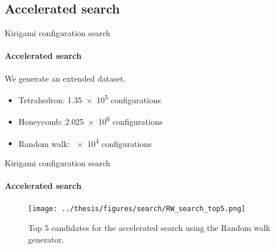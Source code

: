 \documentclass[
	10pt, %
]{beamer}
\begin{document}
\subsection{Accelerated search}
\begin{frame}{Kirigami configuration search}
	\framesubtitle{Accelerated search}
	We generate an extended dataset. 
	\begin{itemize}
		\item Tetrahedron: \num{1.35e5} configurations 
		\item Honeycomb: \num{2.025e6} configurations
		\item Random walk: \num{e4} configurations
	\end{itemize}
\end{frame}
%
%
\begin{frame}{Kirigami configuration search}
	\framesubtitle{Accelerated search}
	\begin{figure}[H]
		\centering
		\texttt{[image: ../thesis/figures/search/RW\_search\_top5.png]}
		\caption{Top 5 candidates for the accelerated search using the Random walk generator. }
	\end{figure}  
\end{frame}
%
%
\end{document}

